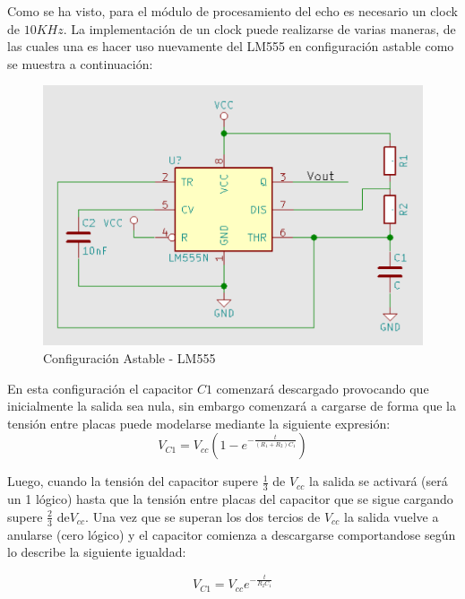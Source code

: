 Como se ha visto, para el módulo de procesamiento del echo es necesario
un clock de $10KHz$. La implementación de un clock puede realizarse
de varias maneras, de las cuales una es hacer uso nuevamente del LM555
en configuración astable como se muestra a continuación:

\begin{figure}[H]
\begin{centering}
\includegraphics[scale=0.4]{astable555.PNG}
\par\end{centering}
\caption{Configuración Astable - LM555}
\end{figure}

En esta configuración el capacitor $C1$ comenzará descargado provocando
que inicialmente la salida sea nula, sin embargo comenzará a cargarse
de forma que la tensión entre placas puede modelarse mediante la siguiente
expresión: 
\begin{equation}
    V_{C1}=V_{cc}(1-e^{-\frac{t}{(R_{1}+R_{2})C_{1}}})   
\end{equation}


Luego, cuando la tensión del capacitor supere $\frac{1}{3}$ de $V_{cc}$
la salida se activará (será un 1 lógico) hasta que la tensión entre
placas del capacitor que se sigue cargando supere $\frac{2}{3}$ de$V_{cc}$.
Una vez que se superan los dos tercios de $V_{cc}$ la salida vuelve
a anularse (cero lógico) y el capacitor comienza a descargarse comportandose
según lo describe la siguiente igualdad:

\begin{equation}
V_{C1}=V_{cc}e^{-\frac{t}{R_{2}C_{1}}}
\end{equation}

